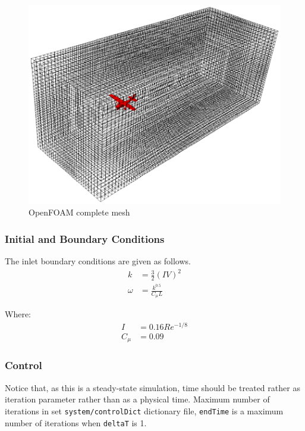 \begin{figure}[h!]
  \centering
  \includegraphics[width=120mm]{eps/openfoam_mesh.eps}
  \caption{OpenFOAM complete mesh}
\end{figure}

\subsubsection{Initial and Boundary Conditions}

The inlet boundary conditions are given as follows. \cite{OpenFOAM-UserGuide-kw-SST}
\begin{align}
  k &= \frac{3}{2} \left( I V \right)^2 \\
  \omega &= \frac{ k^{0.5} }{ C_{\mu} L }
\end{align}

Where: \cite{MoukalledManganiDarwish2016, VersteegMalalasekera2007, Andersson2012, FerzigerPeric2002, FluentUserGuide15}
\begin{align}
  I &= 0.16 Re^{-1/8} \\
  C_{\mu} &= 0.09
\end{align}

\subsubsection{Control}

Notice that, as this is a steady-state simulation, time should be treated rather as iteration parameter rather than as a physical time. Maximum number of iterations in set \texttt{system/controlDict} dictionary file, \texttt{endTime} is a maximum number of iterations when \texttt{deltaT} is 1.

